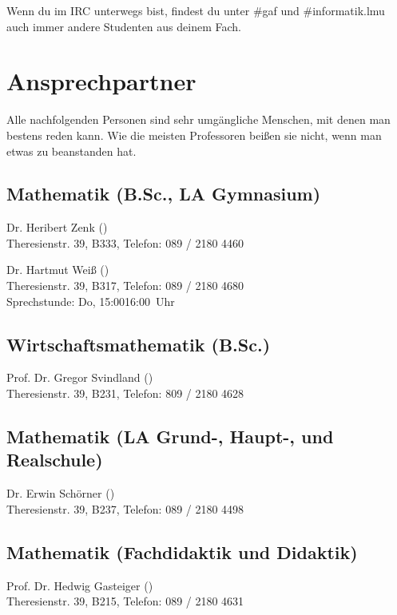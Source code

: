 Wenn du im IRC unterwegs bist, findest du unter \#gaf und \#informatik.lmu
auch immer andere Studenten aus deinem Fach.

\begin{urlList}
\end{urlList}

\section{Ansprechpartner}

Alle nachfolgenden Personen sind sehr umgängliche Menschen, mit denen
man bestens reden kann. Wie die meisten Professoren beißen sie nicht,
wenn man etwas zu beanstanden hat.

\subsection*{Mathematik (B.Sc., LA Gymnasium)}
Dr. Heribert Zenk ()\\
Theresienstr. 39, B333, Telefon: 089 / 2180 \emd{} 4460

Dr. Hartmut Weiß ()\\
Theresienstr. 39, B317, Telefon: 089 / 2180 \emd{} 4680\\
Sprechstunde: Do, 15:00\emd{}16:00~Uhr

\subsection*{Wirtschaftsmathematik (B.Sc.)}
Prof. Dr. Gregor Svindland ()\\
Theresienstr. 39, B231, Telefon: 809 / 2180 \emd{} 4628

\subsection*{Mathematik (LA Grund-, Haupt-, und Realschule)}
Dr. Erwin Schörner ()\\
Theresienstr. 39, B237, Telefon: 089 / 2180 \emd{} 4498

\subsection*{Mathematik (Fachdidaktik und Didaktik)}
Prof. Dr. Hedwig Gasteiger ()\\
Theresienstr. 39, B215, Telefon: 089 / 2180 \emd{} 4631

